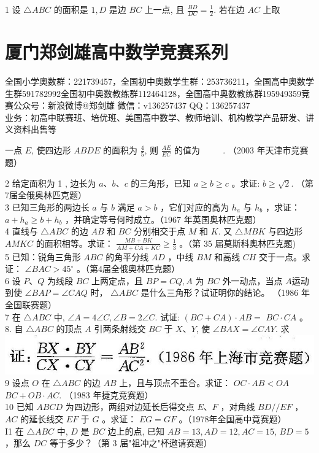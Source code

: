 \documentclass[10pt]{article}
\begin{document}
1 设 $\triangle A B C$ 的面积是 $1, D$ 是边 $B C$ 上一点, 且 $\frac{B D}{D C}=\frac{1}{2}$. 若在边 $A C$ 上取

\section*{厦门郑剑雄高中数学竞赛系列}
全国小学奥数群：221739457，全国初中奥数学生群：253736211，全国高中奥数学生群591782992全国初中奥数教练群112464128，全国高中奥数教练群195949359竞赛公众号：新浪微博@郑剑雄 微信：v136257437 QQ：136257437\\
业务：初高中联赛班、培优班、美国高中数学、教师培训、机构教学产品研发、讲义资料出售等

一点 $E$, 使四边形 $A B D E$ 的面积为 $\frac{4}{5}$, 则 $\frac{A E}{E C}$ 的值为 $\qquad$ . （2003 年天津市竞赛题）

2 给定面积为 1 , 边长为 $a 、 b 、 c$ 的三角形，已知 $a \geqslant b \geqslant c$ 。求证: $b \geqslant \sqrt{2}$. （第7届全俄奥林匹克题）\\
3 已知三角形的两边长 $a$ 与 $b$ 满足 $a>b$ ，它们对应的高为 $h_{a}$ 与 $h_{b}$ ，求证： $a+h_{a} \geqslant b+h_{b}$ ，并确定等号何时成立。（1967 年英国奥林匹克题）\\
4 直线与 $\triangle A B C$ 的边 $A B$ 和 $B C$ 分别相交于点 $M$ 和 $K$. 又 $\triangle M B K$ 与四边形 $A M K C$ 的面积相等。求证： $\frac{M B+B K}{A M+C A+K C} \geqslant \frac{1}{3}$ 。（第 35 届莫斯科奥林匹克题)\\
5 已知：锐角三角形 $A B C$ 的角平分线 $A D$ ，中线 $B M$ 和高线 $C H$ 交于一点。求证： $\angle B A C>45^{\circ}$ 。（第4届全俄奥林匹克题）\\
6 设 $P 、 Q$ 为线段 $B C$ 上两定点，且 $B P=C Q, A$ 为 $B C$ 外一动点，当点 $A$运动到使 $\angle B A P=\angle C A Q$ 时， $\triangle A B C$ 是什么三角形？试证明你的结论。 （1986 年全国联赛题）\\
7 在 $\triangle A B C$ 中, $\angle A=4 \angle C, \angle B=2 \angle C$. 试证: $(B C+C A) \cdot A B=$ $B C \cdot C A$ 。\\
8. 自 $\triangle A B C$ 的顶点 $A$ 引两条射线交 $B C$ 于 $X 、 Y$, 使 $\angle B A X=\angle C A Y$. 求\\
\includegraphics[max width=\textwidth, center]{2024_10_30_2c8f45efd4a519b08e1ag-023}\\
9 设点 $O$ 在 $\triangle A B C$ 的边 $A B$ 上，且与顶点不重合。求证： $O C \cdot A B<O A$ $B C+O B \cdot A C$. （1983 年捷克竞赛题）\\
10 已知 $A B C D$ 为四边形，两组对边延长后得交点 $E 、 F$ ，对角线 $B D / / E F$ ， $A C$ 的延长线交 $E F$ 于 $G$ 。求证： $E G=G F$ 。（1978年全国高中竟赛题）\\
I1 在 $\triangle A B C$ 中, $D$ 是 $B C$ 边上的点, 已知 $A B=13, A D=12, A C=15$, $B D=5$ ，那么 $D C$ 等于多少？（第 3 届"祖冲之"杯邀请赛题）
\end{document}
